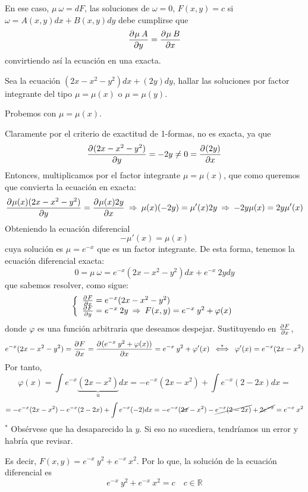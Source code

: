 En ese caso, $\mu \: \omega =dF$, las soluciones de $\omega=0$, $F(x,y)=c$ si $\omega=A(x,y)dx+B(x,y)dy$ debe cumplirse que
$$\frac{\partial^{} \mu \: A}{\partial y}=\frac{\partial^{} \mu \: B}{\partial x}$$
convirtiendo así la ecuación en una exacta.

\begin{eje}
    Sea la ecuación $(2x-x^2-y^2) dx +(2y) dy$, hallar las soluciones por factor integrante del tipo $\mu=\mu(x)$ o $\mu = \mu(y)$.

    Probemos con $\mu=\mu(x)$. 

    Claramente por el criterio de exactitud de 1-formas, no es exacta, ya que $$\frac{\partial^{} (2x-x^2-y^2)}{\partial y}=-2y\neq 0 = \frac{\partial^{} (2y)}{\partial x}$$
    Entonces, multiplicamos por el factor integrante $\mu = \mu(x)$, que como queremos que convierta la ecuación en exacta:
    $$\frac{\partial^{} \mu(x) (2x-x^2-y^2)}{\partial y}= \frac{\partial^{} \mu(x) 2y}{\partial x} \: \Rightarrow \: \mu(x)(-2y)=\mu'(x)2y \: \Rightarrow \: -2y\mu(x)=2y\mu'(x)$$
    Obteniendo la ecuación diferencial
    $$\boxed{-\mu'(x)=\mu(x)}$$
    cuya solución es \underline{$\mu=e^{-x}$} que es un factor integrante. De esta forma, tenemos la ecuación diferencial exacta:
    $$0=\mu \: \omega =e^{-x}(2x-x^2-y^2) dx+e^{-x} \: 2y dy$$
    que sabemos resolver, como sigue:
    $$\left\{\begin{array}{l}
         \frac{\partial^{} F}{\partial x}=e^{-x}(2x-x^2-y^2)  \\
         \frac{\partial^{} F}{\partial y}= e^{-x} \: 2y \: \Rightarrow \: F(x,y)=e^{-x}\: y^2 + \varphi(x)
    \end{array} \right.$$
    donde $\varphi$ es una función arbitraria que deseamos despejar. Sustituyendo en $\frac{\partial^{} F}{\partial x}$, 
    $$e^{-x}(2x-x^2-y^2)= \frac{\partial^{} F}{\partial x}=\frac{\partial^{} (e^{-x}\: y^2 + \varphi(x))}{\partial x}=e^{-x}\: y^2 + \varphi'(x) \: \overset{*}{\iff} \: \varphi'(x)=e^{-x}(2x-x^2)$$
    Por tanto, 
    $$\varphi(x)=\int e^{-x}\underbrace{(2x-x^2)}_{u}dx=-e^{-x}(2x-x^2)+\int e^{-x}(2-2x)dx=$$
    $$=-e^{-x}(2x-x^2)- e^{-x}(2-2x)+\int e^{-x}(-2)dx=-e^{-x}(\cancel{2x}-x^2)-\cancel{e^{-x}(2-2x)}+\cancel{2e^{-x}}=e^{-x} \: x^2$$
    $^*$ Obsérvese que ha desaparecido la $y$. Si eso no sucediera, tendríamos un error y habría que revisar.

    Es decir, $F(x,y)=e^{-x}\: y^2 + e^{-x} \: x^2$. Por lo que, la solución de la ecuación diferencial es
    $$\boxed{e^{-x}\: y^2 + e^{-x} \: x^2=c} \quad c \in \mathbb R$$
\end{eje}
